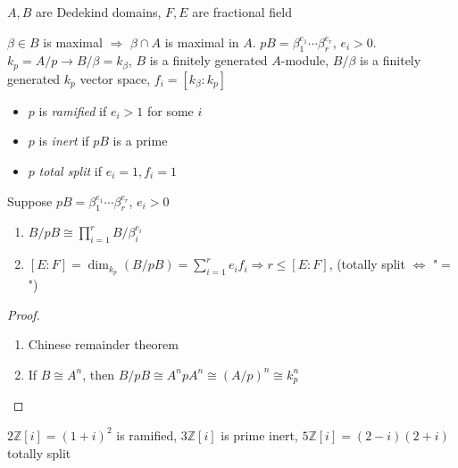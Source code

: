 \documentclass[../main.tex]{subfiles}
\begin{document}
\begin{definition}
$A,B$ are Dedekind domains, $F,E$ are fractional field
\begin{center}
\end{center}
$\beta\in B$ is maximal $\Rightarrow$ $\beta\cap A$ is maximal in $A$. $pB=\beta_1^{e_1}\cdots\beta_r^{e_r}$, $e_i>0$. $k_p=A/p\to B/\beta=k_\beta$, $B$ is a finitely generated $A$-module, $B/\beta$ is a finitely generated $k_p$ vector space, $f_i=[k_\beta:k_p]$
\begin{itemize}
\item  $p$ is \textit{ramified} if $e_i>1$ for some $i$
\item  $p$ is \textit{inert} if $pB$ is a prime
\item $p$ \textit{total split} if $e_i=1,f_i=1$
\end{itemize}
\end{definition}

\begin{proposition}
Suppose $pB=\beta_1^{e_1}\cdots\beta_r^{e_r}$, $e_i>0$
\begin{enumerate}
\item $B/pB\cong\prod_{i=1}^rB/\beta_i^{e_i}$
\item $[E:F]=\dim_{k_p}(B/pB)=\sum_{i=1}^re_if_i\Rightarrow r\leq[E:F]$, (totally split $\Leftrightarrow$ "$=$")
\end{enumerate}
\end{proposition}

\begin{proof}
\begin{enumerate}
\item Chinese remainder theorem
\item If $B\cong A^n$, then $B/pB\cong A^npA^n\cong (A/p)^n\cong k_p^n$
\end{enumerate}
\end{proof}

\begin{example}
$2\mathbb Z[i]=(1+i)^2$ is ramified, $3\mathbb Z[i]$ is prime inert, $5\mathbb Z[i]=(2-i)(2+i)$ totally split
\begin{center}
\end{center}
\end{example}
\end{document}
